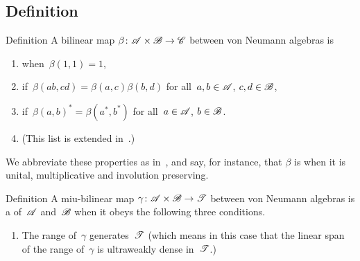 \documentclass[a]{subfiles}
\begin{document}
\subsection{Definition}
\begin{parsec}%
\begin{point}{Definition}%
A bilinear map $\beta\colon \mathscr{A}\times \mathscr{B}\to\mathscr{C}$
between von Neumann algebras is
\begin{enumerate}
\item
{}
when~$\beta(1,1)=1$,
\item
{}
if~$\beta(ab,cd)=\beta(a,c)\beta(b,d)$
for all~$a,b\in\mathscr{A}$, $c,d\in\mathscr{B}$,
\item
{}
if~$\beta(a,b)^*=\beta(a^*,b^*)$
for all~$a\in\mathscr{A}$, $b\in\mathscr{B}$.
\item
(This list is extended in~.)
\end{enumerate}
We abbreviate these properties as in~,
and say, for instance, that $\beta$ is 
when it is unital, multiplicative and involution preserving.

\end{point}
\begin{point}[tensor]{Definition}%
A miu-bilinear map $\gamma\colon \mathscr{A}\times\mathscr{B}\to\mathscr{T}$
between von Neumann algebras
is a  
of~$\mathscr{A}$ and~$\mathscr{B}$
when it obeys the following three conditions.
\begin{enumerate}
\item
\label{tensor-1}
The range of~$\gamma$ generates~$\mathscr{T}$
(which  means in this case that the linear span
of the range of~$\gamma$ is ultraweakly dense in~$\mathscr{T}$.)


\end{enumerate}
\end{point}
\end{parsec}
\end{document}
